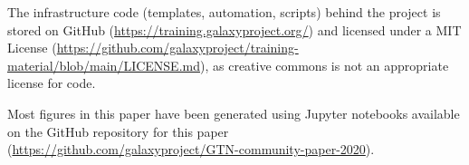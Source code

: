 The infrastructure code (templates, automation, scripts) behind the project is stored on GitHub (\url{https://training.galaxyproject.org/}) and licensed under a MIT License (\url{https://github.com/galaxyproject/training-material/blob/main/LICENSE.md}), as creative commons is not an appropriate license for code.

Most figures in this paper have been generated using Jupyter notebooks available on the GitHub repository for this paper (\url{https://github.com/galaxyproject/GTN-community-paper-2020}).

\footnotesize


\normalsize
